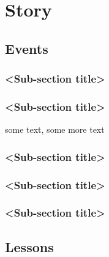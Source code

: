 \chapter{Story}

\section{Events}

\subsection{<Sub-section title>}

\subsection{<Sub-section title>}
some text\cite{citation-2-name-here}, some more text
\subsection{<Sub-section title>}

\subsection{<Sub-section title>}

\subsection{<Sub-section title>}


\section{Lessons}


